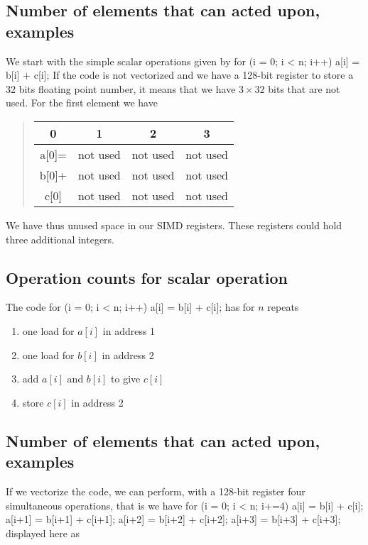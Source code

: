 \documentclass[%
oneside,                 %
final,                   %
10pt]{article}
\begin{document}
\noindent
\subsection{Number of elements that can acted upon, examples}
We start with the simple scalar operations given by
\bcppcod
for (i = 0; i < n; i++){
    a[i] = b[i] + c[i];
}
\ecppcod
If the code is not vectorized  and we have a 128-bit register to store a 32 bits floating point number,
it means that we have $3\times 32$ bits that are not used. For the first element we have



\begin{quote}
\begin{tabular}{cccc}
\hline
\multicolumn{1}{c}{ 0 } & \multicolumn{1}{c}{ 1 } & \multicolumn{1}{c}{ 2 } & \multicolumn{1}{c}{ 3 } \\
\hline
a[0]= & not used & not used & not used \\
\hline
b[0]+ & not used & not used & not used \\
\hline
c[0]  & not used & not used & not used \\
\hline
\end{tabular}
\end{quote}

\noindent
We have thus unused space in our SIMD registers. These registers could hold three additional integers.


\subsection{Operation counts for scalar operation}
The code
\bcppcod
for (i = 0; i < n; i++){
    a[i] = b[i] + c[i];
}
\ecppcod
has for $n$ repeats
\begin{enumerate}
\item one load for $a[i]$ in address 1

\item one load for $b[i]$ in address 2

\item add $a[i]$ and $b[i]$ to give $c[i]$

\item store $c[i]$ in address 2
\end{enumerate}

\noindent
\subsection{Number of elements that can acted upon, examples}
If we vectorize the code, we can perform, with a 128-bit register four simultaneous operations, that is
we have
\bcppcod
for (i = 0; i < n; i+=4){
    a[i] = b[i] + c[i];
    a[i+1] = b[i+1] + c[i+1];
    a[i+2] = b[i+2] + c[i+2];
    a[i+3] = b[i+3] + c[i+3];
}
\ecppcod
displayed here as
\end{document}
